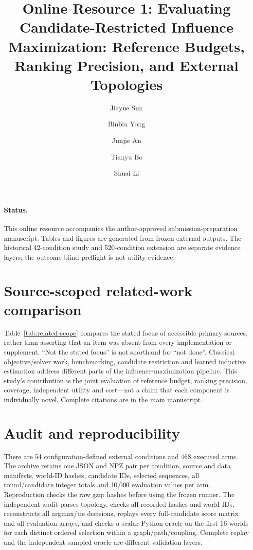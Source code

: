 \documentclass[smallextended]{svjour3}
\begin{document}
\title{Online Resource 1: Evaluating Candidate-Restricted Influence Maximization: Reference Budgets, Ranking Precision, and External Topologies}
\author{Jiayue Sun \and Binbin Yong \and Junjie An \and Tianyu Bo \and Shuai Li}
\date{}\maketitle
\paragraph{Status.} This online resource accompanies the author-approved submission-preparation manuscript. Tables and figures are generated from frozen external outputs. The historical 42-condition study and 520-condition extension are separate evidence layers; the outcome-blind preflight is not utility evidence.

\section{Source-scoped related-work comparison}
Table~\ref{tab:related-scope} compares the stated focus of accessible primary
sources, rather than asserting that an item was absent from every implementation
or supplement. ``Not the stated focus'' is not shorthand for ``not done''.
Classical objective/solver work, benchmarking, candidate restriction and learned
inductive estimation address different parts of the influence-maximization
pipeline. This study's contribution is the joint evaluation of reference budget,
ranking precision, coverage, independent utility and cost---not a claim that each
component is individually novel. Complete citations are in the main manuscript.

\FloatBarrier

\section{Audit and reproducibility}
There are 54 configuration-defined external conditions and 468 executed arms.
The archive retains one JSON and NPZ pair per condition, source and data manifests,
world-ID hashes, candidate IDs, selected sequences, all round/candidate integer
totals and 10,000 evaluation values per arm. Reproduction checks the raw gzip
hashes before using the frozen runner. The independent audit
parses topology, checks all recorded hashes and world IDs, reconstructs all
argmax/tie decisions, replays every full-candidate score matrix and all evaluation
arrays, and checks a scalar Python oracle on the first 16 worlds for each
distinct ordered selection within a graph/path/coupling. Complete replay and the
independent sampled oracle are different validation layers.
\end{document}
